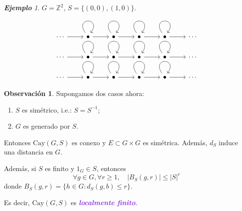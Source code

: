 \documentclass{article}
\theoremstyle{definition}
\newtheorem*{obs}{Observación}
\theoremstyle{remark}
\newtheorem{example}[theorem]{\textbf{Ejemplo}}
\numberwithin{equation}{section}
\newcommand{\Z}{\mathbb{Z}}
\newcommand{\Cay}{\mathrm{Cay}}
\newcommand{\abs}[1]{\left| #1 \right|}
\newcommand{\wea}[1]{\textcolor{BlueViolet}{\textbf{\emph{#1}}}}
\begin{document}
\begin{example}
  $G = \Z^2$, $S = \{(0,0), (1,0)\}$.
  \[\begin{tikzcd}
    \cdots & \bullet & \bullet & \bullet & \bullet & \cdots \\
    \cdots & \bullet & \bullet & \bullet & \bullet & \cdots \\
    \cdots & \bullet & \bullet & \bullet & \bullet & \cdots
    \arrow[from=1-1, to=1-2]
    \arrow[from=1-2, to=1-2, loop, in=55, out=125, distance=10mm]
    \arrow[from=1-2, to=1-3]
    \arrow[from=1-3, to=1-3, loop, in=55, out=125, distance=10mm]
    \arrow[from=1-3, to=1-4]
    \arrow[from=1-4, to=1-4, loop, in=55, out=125, distance=10mm]
    \arrow[from=1-4, to=1-5]
    \arrow[from=1-5, to=1-5, loop, in=55, out=125, distance=10mm]
    \arrow[from=1-5, to=1-6]
    \arrow[from=2-1, to=2-2]
    \arrow[from=2-2, to=2-2, loop, in=55, out=125, distance=10mm]
    \arrow[from=2-2, to=2-3]
    \arrow[from=2-3, to=2-3, loop, in=55, out=125, distance=10mm]
    \arrow[from=2-3, to=2-4]
    \arrow[from=2-4, to=2-4, loop, in=55, out=125, distance=10mm]
    \arrow[from=2-4, to=2-5]
    \arrow[from=2-5, to=2-5, loop, in=55, out=125, distance=10mm]
    \arrow[from=2-5, to=2-6]
    \arrow[from=3-1, to=3-2]
    \arrow[from=3-2, to=3-2, loop, in=55, out=125, distance=10mm]
    \arrow[from=3-2, to=3-3]
    \arrow[from=3-3, to=3-3, loop, in=55, out=125, distance=10mm]
    \arrow[from=3-3, to=3-4]
    \arrow[from=3-4, to=3-4, loop, in=55, out=125, distance=10mm]
    \arrow[from=3-4, to=3-5]
    \arrow[from=3-5, to=3-5, loop, in=55, out=125, distance=10mm]
    \arrow[from=3-5, to=3-6]
  \end{tikzcd}\]
\end{example}

\begin{obs}
  Supongamos dos casos ahora:
  \begin{enumerate}
    \item $S$ es simétrico, i.e.: $S = S^{-1}$;
    \item $G$ es generado por $S$.
  \end{enumerate}
  Entonces $\Cay(G,S)$ es conexo y $E \subset G \times G$ es simétrica. Además, $d_S$ induce una distancia en $G$.

  Además, si $S$ es finito y $1_G \in S$, entonces
  \[\forall g \in G, \forall r \geq 1, \quad \abs{B_S(g,r)} \leq \abs{S}^r\]
  donde $B_S(g,r) = \{h \in G \colon d_S(g,b) \leq r\}$.

  Es decir, $\Cay(G,S)$ es \wea{localmente finito}.
\end{obs}
\end{document}
